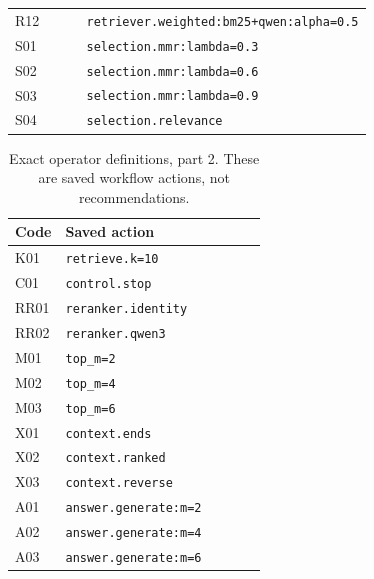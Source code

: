 \begin{table}[p]
\begin{tabular}{@{}lp{0.80\linewidth}@{}}
R12 & \texttt{retriever.\allowbreak{}weighted:\allowbreak{}bm25+\allowbreak{}qwen:\allowbreak{}alpha=\allowbreak{}0.\allowbreak{}5} \\
S01 & \texttt{selection.\allowbreak{}mmr:\allowbreak{}lambda=\allowbreak{}0.\allowbreak{}3} \\
S02 & \texttt{selection.\allowbreak{}mmr:\allowbreak{}lambda=\allowbreak{}0.\allowbreak{}6} \\
S03 & \texttt{selection.\allowbreak{}mmr:\allowbreak{}lambda=\allowbreak{}0.\allowbreak{}9} \\
S04 & \texttt{selection.\allowbreak{}relevance} \\
\bottomrule
\end{tabular}
\end{table}

\begin{table}[p]
\centering
\small
\setlength{\tabcolsep}{4pt}
\caption{Exact operator definitions, part 2. These are saved workflow actions, not recommendations.}
\label{tab:rag-operator-dictionary-2}
\begin{tabular}{@{}lp{0.80\linewidth}@{}}
\toprule
Code & Saved action \\
\midrule
K01 & \texttt{retrieve.\allowbreak{}k=\allowbreak{}10} \\
C01 & \texttt{control.\allowbreak{}stop} \\
RR01 & \texttt{reranker.\allowbreak{}identity} \\
RR02 & \texttt{reranker.\allowbreak{}qwen3} \\
M01 & \texttt{top\_m=\allowbreak{}2} \\
M02 & \texttt{top\_m=\allowbreak{}4} \\
M03 & \texttt{top\_m=\allowbreak{}6} \\
X01 & \texttt{context.\allowbreak{}ends} \\
X02 & \texttt{context.\allowbreak{}ranked} \\
X03 & \texttt{context.\allowbreak{}reverse} \\
A01 & \texttt{answer.\allowbreak{}generate:\allowbreak{}m=\allowbreak{}2} \\
A02 & \texttt{answer.\allowbreak{}generate:\allowbreak{}m=\allowbreak{}4} \\
A03 & \texttt{answer.\allowbreak{}generate:\allowbreak{}m=\allowbreak{}6} \\
\bottomrule
\end{tabular}
\end{table}
